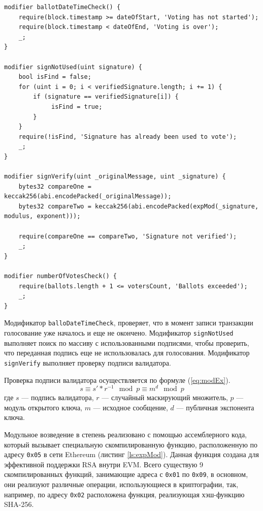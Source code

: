 \begin{lstlisting}[caption={Модификаторы метода pushBallot}, label={ls:modify}]
modifier ballotDateTimeCheck() {
    require(block.timestamp >= dateOfStart, 'Voting has not started');
    require(block.timestamp < dateOfEnd, 'Voting is over');
    _;
}

modifier signNotUsed(uint signature) {
    bool isFind = false;
    for (uint i = 0; i < verifiedSignature.length; i += 1) {
        if (signature == verifiedSignature[i]) {
             isFind = true;
        }
    }
    require(!isFind, 'Signature has already been used to vote');
    _;
}

modifier signVerify(uint _originalMessage, uint _signature) {
    bytes32 compareOne = keccak256(abi.encodePacked(_originalMessage));
    bytes32 compareTwo = keccak256(abi.encodePacked(expMod(_signature, modulus, exponent)));

    require(compareOne == compareTwo, 'Signature not verified');
    _;
}

modifier numberOfVotesCheck() {
    require(ballots.length + 1 <= votersCount, 'Ballots exceeded');
    _;
}
\end{lstlisting}

Модификатор \verb|balloDateTimeCheck|, проверяет, что в момент записи транзакции голосование уже началось и еще не окончено. Модификатор \verb|signNotUsed| выполняет поиск по массиву с использованными подписями, чтобы проверить, что переданная подпись еще не использовалась для голосования. Модификатор \verb|signVerify| выполняет проверку подписи валидатора.

Проверка подписи валидатора осуществляется по формуле (\ref{eq:modEx}).
\begin{equation}\label{eq:modEx}
s \equiv s' * r^{-1} \mod{p} \equiv m^d \mod{p}
\end{equation}
где  $s$ — подпись валидатора, $r$ — случайный маскирующий множитель, $p$ — модуль открытого ключа, $m$ — исходное сообщение, $d$ — публичная экспонента ключа.

Модульное возведение в степень реализовано с помощью ассемблерного кода, который вызывает специальную скомпилированную функцию, расположенную по адресу \verb|0x05| в сети Ethereum (листинг \ref{ls:expMod}). Данная функция создана для эффективной поддержки RSA внутри EVM. Всего существую 9 скомпилированных функций, занимающие адреса с \verb|0x01| по \verb|0x09|, в основном, они реализуют различные операции, использующиеся в криптографии, так, например, по адресу \verb|0x02| расположена функция, реализующая хэш-функцию SHA-256.

